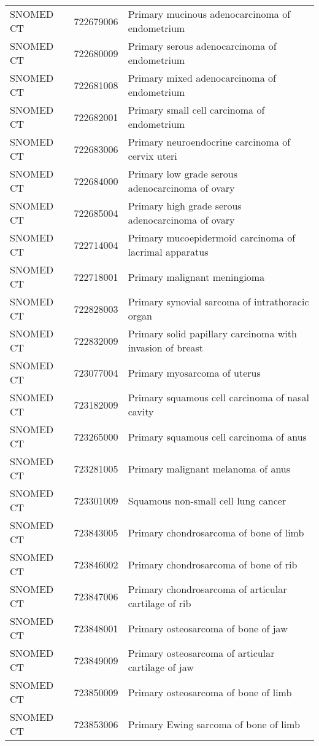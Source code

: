 \begin{longtable}{p{}p{}p{}}
  SNOMED CT & 722679006 & Primary mucinous adenocarcinoma of endometrium \\ 
  SNOMED CT & 722680009 & Primary serous adenocarcinoma of endometrium \\ 
  SNOMED CT & 722681008 & Primary mixed adenocarcinoma of endometrium \\ 
  SNOMED CT & 722682001 & Primary small cell carcinoma of endometrium \\ 
  SNOMED CT & 722683006 & Primary neuroendocrine carcinoma of cervix uteri \\ 
  SNOMED CT & 722684000 & Primary low grade serous adenocarcinoma of ovary \\ 
  SNOMED CT & 722685004 & Primary high grade serous adenocarcinoma of ovary \\ 
  SNOMED CT & 722714004 & Primary mucoepidermoid carcinoma of lacrimal apparatus \\ 
  SNOMED CT & 722718001 & Primary malignant meningioma \\ 
  SNOMED CT & 722828003 & Primary synovial sarcoma of intrathoracic organ \\ 
  SNOMED CT & 722832009 & Primary solid papillary carcinoma with invasion of breast \\ 
  SNOMED CT & 723077004 & Primary myosarcoma of uterus \\ 
  SNOMED CT & 723182009 & Primary squamous cell carcinoma of nasal cavity \\ 
  SNOMED CT & 723265000 & Primary squamous cell carcinoma of anus \\ 
  SNOMED CT & 723281005 & Primary malignant melanoma of anus \\ 
  SNOMED CT & 723301009 & Squamous non-small cell lung cancer \\ 
  SNOMED CT & 723843005 & Primary chondrosarcoma of bone of limb \\ 
  SNOMED CT & 723846002 & Primary chondrosarcoma of bone of rib \\ 
  SNOMED CT & 723847006 & Primary chondrosarcoma of articular cartilage of rib \\ 
  SNOMED CT & 723848001 & Primary osteosarcoma of bone of jaw \\ 
  SNOMED CT & 723849009 & Primary osteosarcoma of articular cartilage of jaw \\ 
  SNOMED CT & 723850009 & Primary osteosarcoma of bone of limb \\ 
  SNOMED CT & 723853006 & Primary Ewing sarcoma of bone of limb \\ 

\end{longtable}

